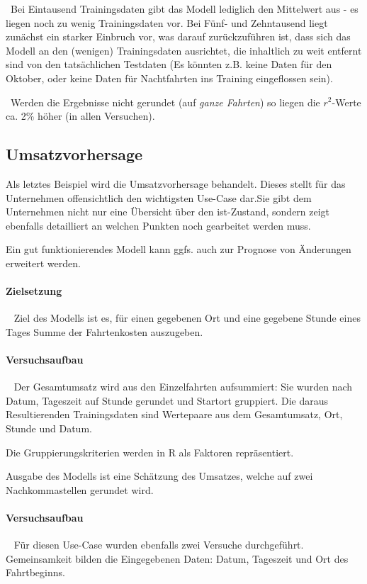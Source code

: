 ~\newline Bei Eintausend Trainingsdaten gibt das Modell lediglich den Mittelwert aus - es liegen noch zu wenig Trainingsdaten vor. Bei Fünf- und Zehntausend liegt zunächst ein starker Einbruch vor, was darauf zurückzuführen ist, dass sich das Modell an den (wenigen) Trainingsdaten ausrichtet, die inhaltlich zu weit entfernt sind von den tatsächlichen Testdaten (Es könnten z.B. keine Daten für den Oktober, oder keine Daten für Nachtfahrten ins Training eingeflossen sein).

~\newline Werden die Ergebnisse nicht gerundet (auf \textit{ganze Fahrten}) so liegen die $r^2$-Werte ca. 2\% höher (in allen Versuchen).
\newpage
\subsection{Umsatzvorhersage}
\label{sec:RevPred}
Als letztes Beispiel wird die Umsatzvorhersage behandelt. Dieses stellt für das Unternehmen offensichtlich den wichtigsten Use-Case dar.Sie gibt dem Unternehmen nicht nur eine Übersicht über den ist-Zustand, sondern zeigt ebenfalls detailliert an welchen Punkten noch gearbeitet werden muss. 

Ein gut funktionierendes Modell kann ggfs. auch zur Prognose von Änderungen erweitert werden.
\paragraph{Zielsetzung} ~\newline
Ziel des Modells ist es, für einen gegebenen Ort und eine gegebene Stunde eines Tages Summe der Fahrtenkosten auszugeben. 

\paragraph{Versuchsaufbau} ~\newline
Der Gesamtumsatz wird aus den Einzelfahrten aufsummiert: Sie wurden nach Datum, Tageszeit auf Stunde gerundet und Startort gruppiert. Die daraus Resultierenden Trainingsdaten sind Wertepaare aus dem Gesamtumsatz, Ort, Stunde und Datum. 

Die Gruppierungskriterien werden in R als Faktoren repräsentiert. 

Ausgabe des Modells ist eine Schätzung des Umsatzes, welche auf zwei Nachkommastellen gerundet wird. 

\paragraph{Versuchsaufbau} ~\newline
Für diesen Use-Case wurden ebenfalls zwei Versuche durchgeführt. Gemeinsamkeit bilden die Eingegebenen Daten: Datum, Tageszeit und Ort des Fahrtbeginns. 

